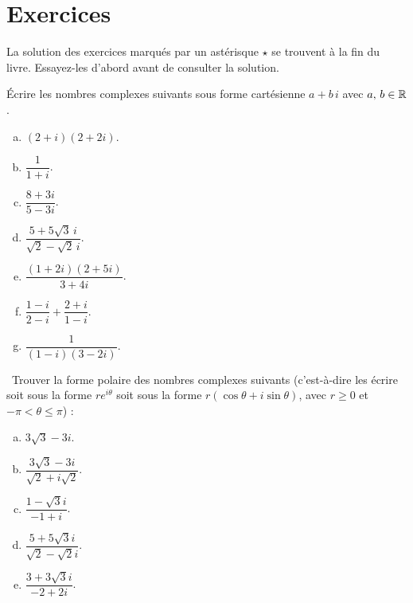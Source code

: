 \section*{Exercices}
La solution des exercices marqués par un astérisque $\star$ se trouvent à la fin du livre. Essayez-les d'abord avant de consulter la solution.

\begin{prob}
\label{prob01.1}\sov

 Écrire les nombres complexes suivants sous forme cartésienne   $a + b \,i$ avec $a,\, b \in \mathbb{R}$.
\medskip
\begin{enumerate}[a)]
\item $(2+i)(2+2 i)$. \medskip  
\item $ \dfrac 1{1+i}$.\medskip 
\item $ \dfrac{8+3i}{5-3i}$.\medskip 
\item $\dfrac{5+5\sqrt{3}\,i}{\sqrt{2}-\sqrt{2}\,i}$.\medskip 
\item $\dfrac{(1+2i)(2+5i)}{3+4i}$.\medskip  
\item $\dfrac{1-i}{2-i}+\dfrac{2+i}{1-i}$.\smallskip
\item $ \dfrac 1{(1-i)(3-2i)}$.
\end{enumerate}

\end{prob}
\begin{prob}
\label{prob01.2}\sov~Trouver la forme polaire des nombres complexes suivants (c'est-à-dire les écrire soit sous la forme $r e^{i\theta}$ soit sous la forme $r(\cos \theta + i \sin \theta)$, avec $r\ge 0$ et $-\pi <\theta \le \pi$) :\medskip
\begin{enumerate}[a)]

\item ${3\sqrt{3}-3i}$.\medskip
\item $\dfrac{3\sqrt{3}-3i} {\sqrt{2}+i\sqrt{2}}$.\medskip

\item $\dfrac{1-\sqrt{3}i}{-1+i}$. \medskip
\item $\dfrac{5+5\sqrt{3}i}{\sqrt{2}-\sqrt{2}i}$. \medskip
\item $\dfrac{3+3\sqrt{3}i} {-2+2i}$. \medskip
\end{enumerate}

\end{prob}

